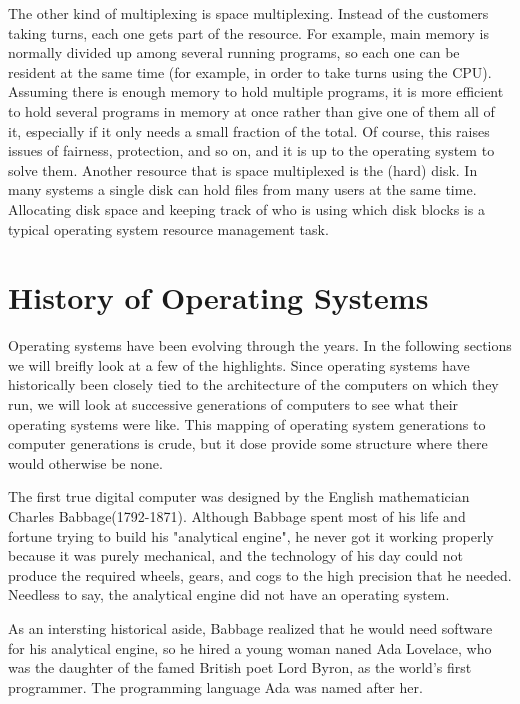 \documentclass{book}
\begin{document}
The other kind of multiplexing is space multiplexing. 
Instead of the customers taking turns, each one gets part of the resource.
For example, main memory is normally divided up among several running programs, so each one can be resident at the same time 
(for example, in order to take turns using the CPU).
Assuming there is enough memory to hold multiple programs, 
it is more efficient to hold several programs in memory at once rather than give one of them all of it, 
especially if it only needs a small fraction of the total.
Of course, this raises issues of fairness, protection, and so on, and it is up to the operating system to solve them.
Another resource that is space multiplexed is the (hard) disk.
In many systems a single disk can hold files from many users at the same time.
Allocating disk space and keeping track of who is using which disk blocks is a typical operating system resource management task.

\section{History of Operating Systems}
Operating systems have been evolving through the years.
In the following sections we will breifly look at a few of the highlights.
Since operating systems have historically been closely tied to the architecture of the computers on which they run, 
we will look at successive generations of computers to see what their operating systems were like.
This mapping of operating system generations to computer generations is crude, but it dose provide some structure where there would otherwise be none.

The first true digital computer was designed by the English mathematician Charles Babbage(1792-1871).
Although Babbage spent most of his life and fortune trying to build his "analytical engine", 
he never got it working properly because it was purely mechanical, 
and the technology of his day could not produce the required wheels, gears, and cogs to the high precision that he needed.
Needless to say, the analytical engine did not have an operating system.

As an intersting historical aside, Babbage realized that he would need software for his analytical engine, 
so he hired a young woman naned Ada Lovelace, who was the daughter of the famed British poet Lord Byron, as the world's first programmer.
The programming language Ada was named after her.
\end{document}
